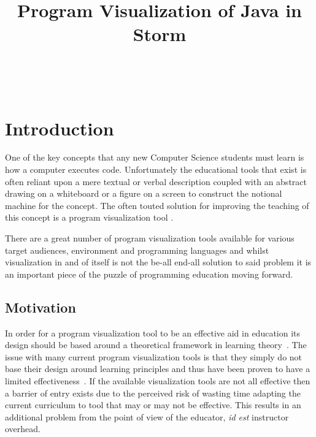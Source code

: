 \documentclass{sigchi}
\def\plaintitle{Program Visualization of Java in Storm}
\begin{document}
\title{\plaintitle}

\author{%
  \\
  \\
}

\maketitle
\section{Introduction}
One of the key concepts that any new Computer Science students must learn is how a computer executes code. Unfortunately the educational tools that exist is often reliant upon a mere textual or verbal description coupled with an abstract drawing on a whiteboard or a figure on a screen to construct the notional machine for the concept. The often touted solution for improving the teaching of this concept is a program visualization tool \cite{Hidalgo:2016}.

There are a great number of program visualization tools available for various target audiences, environment and programming languages \cite{Sorva:2013} and whilst visualization in and of itself is not the be-all end-all solution to said problem it is an important piece of the puzzle of programming education moving forward.

\subsection{Motivation}
In order for a program visualization tool to be an effective aid in education its design should be based around a theoretical framework in learning theory~\cite{Hidalgo:2016}. The issue with many current program visualization tools is that they simply do not base their design around learning principles and thus have been proven to have a limited effectiveness~\cite{Naps:2002}. If the available visualization tools are not all effective then a barrier of entry exists due to the perceived risk of wasting time adapting the current curriculum to tool that may or may not be effective. This results in an additional problem from the point of view of the educator, \emph{id est} instructor overhead.
\end{document}
